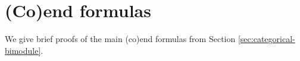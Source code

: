 


\section{(Co)end formulas}\label{sec:coend-proofs}
We give brief proofs of the main (co)end formulas from Section \ref{sec:categorical-bimodule}.

